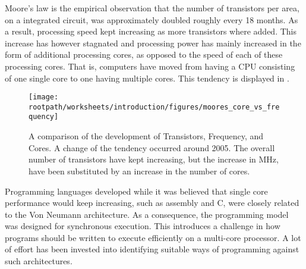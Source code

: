 \makeatletter {}\makeatother
{}
Moore's law\cite{moore1965cramming} is the empirical observation that the number of transistors per area, on a integrated circuit, was approximately doubled roughly every 18 months\cite[p. 203]{mack2011fifty}. As a result, processing speed kept increasing as more transistors where added. This increase has however stagnated and processing power has mainly increased in the form of additional processing cores, as opposed to the speed of each of these processing cores\cite[p. 22]{sevenModels}. That is, computers have moved from having a \ac{CPU} consisting of one single core to one having multiple cores. This tendency is displayed in . 
\label{chap:introduction}

\begin{figure}[htbp]
\centering
 \texttt{[image: \\rootpath/worksheets/introduction/figures/moores\_core\_vs\_frequency]} 
 \caption{A comparison of the development of Transistors, Frequency, and Cores\cite{isca2009}. A change of the tendency occurred around 2005. The overall number of transistors have kept increasing, but the increase in MHz, have been substituted by an increase in the number of cores.}
\label{fig:moores_in_reality}
\end{figure}

Programming languages developed while it was believed that single core performance would keep increasing, such as assembly and C, were closely related to the Von Neumann architecture. As a consequence, the programming model was designed for synchronous execution. This introduces a challenge in how programs should be written to execute efficiently on a multi-core processor. A lot of effort has been invested into identifying suitable ways of programming against such architectures\cite{shavit1997software}\cite{haller2007actors}\cite{hewitt2014actor}\cite{scherer2005advanced}. 

